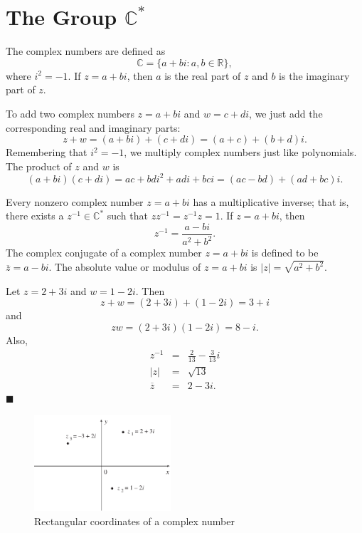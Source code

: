  
\section{The Group ${\mathbb C}^\ast$}
 
 
The {\bfi complex numbers} are defined as
$$
{\mathbb C} = \{ a + bi : a, b \in {\mathbb R} \},
$$
where $i^2 = -1$.  If $z=a+bi$, then $a$ is the {\bfi real part} of $z$
and $b$ is the {\bfi imaginary part} of $z$. 
 
 
To add two complex numbers $z=a+bi$ and $w= c+di$, we just
add the corresponding real and imaginary parts:
$$
z+w=(a + bi ) + (c + di)  =  (a+c) + (b+d)i.
$$
Remembering that $i^2 = -1$,  we multiply complex numbers just like
polynomials. The product of $z$ and $w$ is 
$$
(a + bi )(c + di)  =   ac + bdi^2 + adi + bci =  (ac -bd) +
(ad + bc)i.
$$
 
 
Every nonzero complex number $z = a +bi$ has a multiplicative inverse;
that is, there exists a $z^{-1} \in {\mathbb C}^\ast$ such that $z z^{-1}
= z^{-1} z = 1$. If $z = a + bi$, then 
$$
z^{-1} = \frac{a-bi}{ a^2 + b^2  }.
$$
The {\bfi complex conjugate} of a complex
number $z = a +bi$ is defined to be $\overline{z} = a-bi$.  The {\bfi
absolute value} or {\bfi modulus} of  $z = a +bi$  is $|z| =
\sqrt{a^2+b^2}$.  
 
 
\vspace{ 2ex }
 
 
Let $z = 2 + 3i$ and $w = 1-2i$. Then
$$
z + w = (2 + 3i)+( 1-2i ) = 3 +i
$$
and
$$
z  w = (2 + 3i)( 1-2i ) = 8-i.
$$
Also,
\begin{eqnarray*}
z^{-1} & = & \frac{2}{13} - \frac{3}{13}i \\
|z| & = & \sqrt{13} \\
\overline{z} & = & 2-3i.
\end{eqnarray*}
\hspace{\fill} $\blacksquare$
 
\vspace{ 2ex }
 
\begin{figure}[hbt]
\begin{center}
\centerline {
\includegraphics[width=2in]{rectcoord}
}
\end{center}
\caption{Rectangular coordinates of a complex number}
\label{rectcoord}
\end{figure}
 
